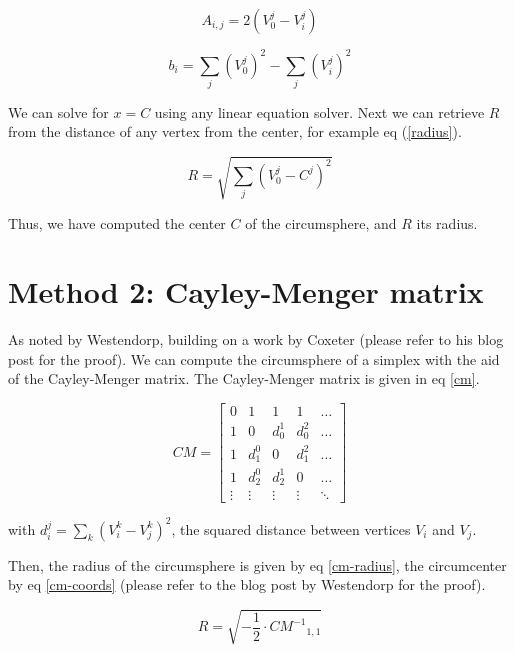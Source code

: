 \begin{equation} \label{a}
A_{i,j} = 2 \left( V_0^j - V_i^j \right)
\end{equation}

\begin{equation} \label{b}
b_{i} = \sum_j \left( V_0^j \right)^2 - \sum_j \left( V_i^j \right)^2
\end{equation}

We can solve for $x = C$ using any linear equation solver. Next we can
retrieve $R$ from the distance of any vertex from the center, for example
eq (\ref{radius}).

\begin{equation} \label{radius}
R = \sqrt{\sum_j \left( V_0^j - C^j \right)^2}
\end{equation}

Thus, we have computed the center $C$ of the circumsphere, and $R$ its radius.

\section{Method 2: Cayley-Menger matrix}
As noted by Westendorp, building on a work by Coxeter (please refer to his
blog post for the proof). We can compute the circumsphere of a simplex
with the aid of the Cayley-Menger matrix. The Cayley-Menger matrix is
given in eq \ref{cm}.

\begin{equation} \label{cm}
CM = \begin{bmatrix}
0 & 1 & 1 & 1 & \dots \\
1 & 0 & d_0^1 & d_0^2 & \dots \\
1 & d_1^0 & 0 & d_1^2 & \dots \\
1 & d_2^0 & d_2^1 & 0 & \dots \\
\vdots & \vdots & \vdots & \vdots & \ddots
\end{bmatrix}
\end{equation}

with $d_i^j = \sum_k \left( V_i^k - V_j^k \right)^2$, the squared distance
between vertices $V_i$ and $V_j$.

Then, the radius of the circumsphere is given by eq \ref{cm-radius}, the
circumcenter by eq \ref{cm-coords} (please refer to the blog post by Westendorp
for the proof).

\begin{equation} \label{cm-radius}
R = \sqrt{- \frac{1}{2} \cdot {CM^{-1}}_{1,1}}
\end{equation}

